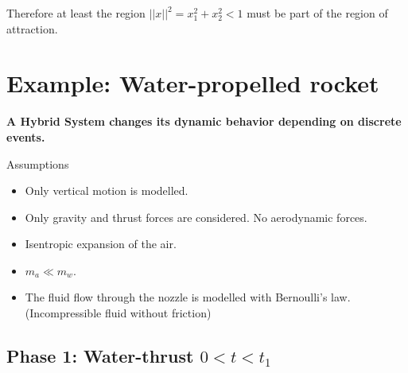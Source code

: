 \documentclass[10pt,a4paper]{scrartcl}
\begin{document}
\begin{multicols*}{3}


Therefore at least the region $||x||^2=x_1^2+x_2^2<1$ must be part of the region of attraction.


\vfill
\null
\newpage

\section{Example: Water-propelled rocket}




\textbf{A Hybrid System changes its dynamic behavior depending on discrete events.}

\finn

Assumptions
\begin{itemize}
\item Only vertical motion is modelled.
\item Only gravity and thrust forces are considered. No aerodynamic forces.
\item Isentropic expansion of the air.
\item $m_a\ll m_w$.
\item The fluid flow through the nozzle is modelled with Bernoulli's law. (Incompressible fluid without friction)
\end{itemize}

\vfill
\null
\columnbreak

\subsection{Phase 1: Water-thrust $0<t<t_1$}





\end{multicols*}
\end{document}

